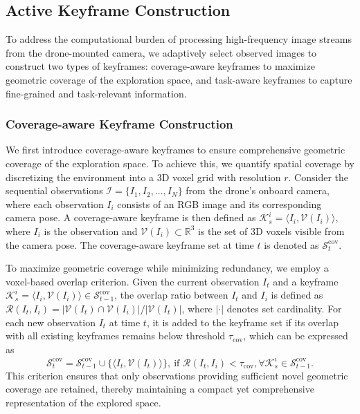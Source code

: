 \subsection{Active Keyframe Construction}\label{IVA}
To address the computational burden of processing high-frequency image streams from the drone-mounted camera, we adaptively select observed images to construct two types of keyframes: coverage-aware keyframes to maximize geometric coverage of the exploration space, and task-aware keyframes to capture fine-grained and task-relevant information.

\subsubsection{Coverage-aware Keyframe Construction}
We first introduce coverage-aware keyframes to ensure comprehensive geometric coverage of the exploration space. To achieve this, we quantify spatial coverage by discretizing the environment into a 3D voxel grid with resolution $r$. Consider the sequential observations $\mathcal{I} = \{I_1, I_2, \ldots, I_N\}$ from the drone's onboard camera, where each observation $I_i$ consists of an RGB image and its corresponding camera pose. A coverage-aware keyframe is then defined as $\mathcal{K}_s^i = \langle I_i, \mathcal{V}(I_i) \rangle$, where $I_i$ is the observation and $\mathcal{V}(I_i) \subset \mathbb{R}^3$ is the set of 3D voxels visible from the camera pose. The coverage-aware keyframe set at time $t$ is denoted as $\mathcal{S}_t^{\text{cov}}$.

To maximize geometric coverage while minimizing redundancy, we employ a voxel-based overlap criterion. 
Given the current observation $I_t$ and a keyframe $\mathcal{K}_s^i = \langle I_i, \mathcal{V}(I_i) \rangle \in \mathcal{S}_{t-1}^{\text{cov}}$, the overlap ratio between $I_t$ and $I_i$ is defined as $\mathcal{R}(I_t, I_i) = |\mathcal{V}(I_t) \cap \mathcal{V}(I_i)| / |\mathcal{V}(I_t)|$,
where $|\cdot|$ denotes set cardinality. 
For each new observation $I_t$ at time $t$, it is added to the keyframe set if its overlap with all existing keyframes remains below threshold $\tau_{\text{cov}}$, which can be expressed as
\begin{equation}
\mathcal{S}_t^{\text{cov}} = \mathcal{S}_{t-1}^{\text{cov}} \cup \{\langle I_t, \mathcal{V}(I_t) \rangle\}, \ \text{if } \mathcal{R}(I_t, I_i) < \tau_{\text{cov}}, \forall \mathcal{K}_s^i \in \mathcal{S}_{t-1}^{\text{cov}}.
\end{equation}
This criterion ensures that only observations providing sufficient novel geometric coverage are retained, thereby maintaining a compact yet comprehensive representation of the explored space.

